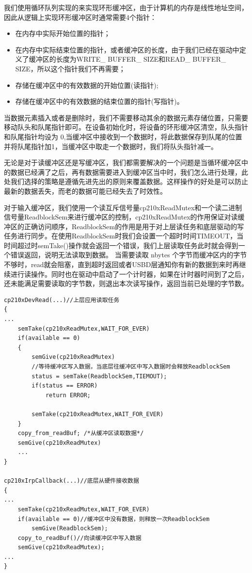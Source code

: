  
	我们使用循环队列实现的来实现环形缓冲区，由于计算机的内存是线性地址空间，因此从逻辑上实现环形缓冲区时通常需要4个指针：
	 \begin{itemize}
	 \item 在内存中实际开始位置的指针；
	 \item 在内存中实际结束位置的指针，或者缓冲区的长度，由于我们已经在驱动中定义了缓冲区的长度为WRITE\_ BUFFER\_ SIZE和READ\_ BUFFER\_ SIZE，所以这个指针我们不再需要；
	 \item 存储在缓冲区中的有效数据的开始位置(读指针);
	 \item 存储在缓冲区中的有效数据的结束位置的指针(写指针)。
	 \end{itemize}
	
	当数据元素插入或者是删除时，我们不需要移动其余的数据元素存储位置，只需要移动队头和队尾指针即可。在设备初始化时，将设备的环形缓冲区清空，队头指针和队尾指针均设为 0,当缓冲区中接收到一个数据时，将此数据保存到队尾的位置并将队尾指针加1，当缓冲区中取走一个数据时，我们将队头指针减一。

	无论是对于读缓冲区还是写缓冲区，我们都需要解决的一个问题是当循环缓冲区中的数据已经满了之后，再有数据需要进入到缓冲区当中时，我们怎么进行处理，此处我们选择的策略是遵循先进先出的原则来覆盖数据。这样操作的好处是可以防止最新的数据丢失，而老的数据可能已经失去了时效性。

	对于输入缓冲区，我们使用一个读互斥信号量cp210xReadMutex和一个读二进制信号量ReadblockSem来进行缓冲区的控制，cp210xReadMutex的作用保证对读缓冲区的正确访问顺序，ReadblockSem的作用是用于对上层读任务和底层驱动的写任务进行同步。在使用ReadblockSem时我们会设置一个超时时间TIMEOUT，当时间超过时semTake()操作就会返回一个错误，我们上层读取任务此时就会得到一个错误返回，说明无法读取到数据。
	当需要读取 nbytes 个字节而缓冲区内的字节不够时，read就会阻塞，直到超时返回或者USBD层通知你有新的数据到来时再继续进行读操作。同时也在驱动中启动了一个计时器，如果在计时器时间到了之后，还未能满足需要读取的字节数，则退出本次读写操作，返回当前已处理的字节数。

\lstset{language=C}
\begin{lstlisting}
cp210xDevRead(...)//上层应用读取任务
{
...
	semTake(cp210xReadMutex,WAIT_FOR_EVER)	
	if(available == 0)
	{
		semGive(cp210xReadMutex)
		//等待缓冲区写入数据，当底层往缓冲区中写入数据时会释放ReadblockSem
		status = semTake(ReadblockSem,TIEMOUT);
		if(status == ERROR)
			return ERROR;
			
		semTake(cp210xReadMutex,WAIT_FOR_EVER)
	}
	copy_from_readBuf; /*从缓冲区读取数据*/
	semGive(cp210xReadMutex)
	...
}

cp210xIrpCallback(...)//底层从硬件接收数据
{
...
	semTake(cp210xReadMutex,WAIT_FOR_EVER)
	if(available == 0)//缓冲区中没有数据，则释放一次ReadblockSem
		semGive(ReadblockSem);
	copy_to_readBuf()//向读缓冲区中写入数据
	semGive(cp210xReadMutex);
...
}
\end{lstlisting}  


